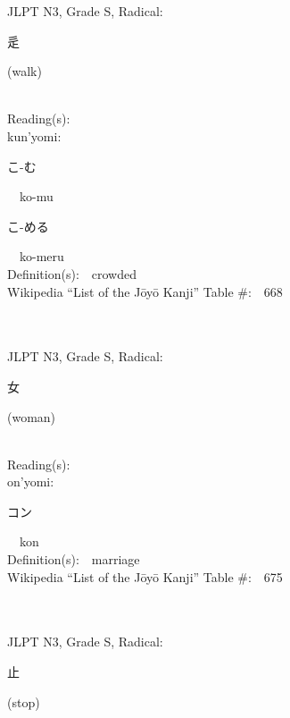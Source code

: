 \begin{multicols}{2}
{JLPT N3, Grade S, Radical:\ \ {\begin{CJK}{UTF8}{min} 辵 \end{CJK}} (walk) } \\
Reading(s):\ \ \\
{\hspace*{1em}}kun'yomi:\ \ \\
{\hspace*{2em}}{\begin{CJK}{UTF8}{min} こ-む \end{CJK}}\ \ ko-mu\ \ \\
{\hspace*{2em}}{\begin{CJK}{UTF8}{min} こ-める \end{CJK}}\ \ ko-meru\ \ \\
Definition(s):\ \ crowded \\
Wikipedia ``List of the J\=oy\=o Kanji'' Table \#:\ \ 668 \\
\ \ \\
{\fontsize{34pt}{40pt}  }\ \ \\  %
{JLPT N3, Grade S, Radical:\ \ {\begin{CJK}{UTF8}{min} 女 \end{CJK}} (woman) } \\
Reading(s):\ \ \\
{\hspace*{1em}}on'yomi:\ \ \\
{\hspace*{2em}}{\begin{CJK}{UTF8}{min} コン \end{CJK}}\ \ kon\ \ \\
Definition(s):\ \ marriage \\
Wikipedia ``List of the J\=oy\=o Kanji'' Table \#:\ \ 675 \\
\ \ \\
{\fontsize{34pt}{40pt}  }\ \ \\  %
{JLPT N3, Grade S, Radical:\ \ {\begin{CJK}{UTF8}{min} 止 \end{CJK}} (stop) } \\

\end{multicols}
